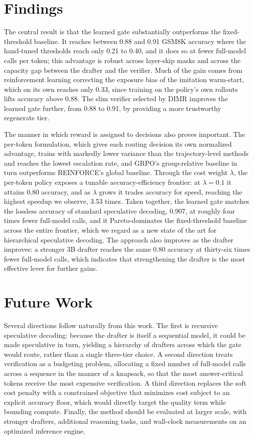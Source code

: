 \documentclass[11pt]{article}
\begin{document}
\section{Findings}
The central result is that the learned gate substantially outperforms the fixed-threshold baseline. It
reaches between 0.88 and 0.91 GSM8K accuracy where the hand-tuned thresholds reach only 0.21 to 0.40,
and it does so at fewer full-model calls per token; this advantage is robust across layer-skip masks
and across the capacity gap between the drafter and the verifier. Much of the gain comes from
reinforcement learning correcting the exposure bias of the imitation warm-start, which on its own
reaches only 0.33, since training on the policy's own rollouts lifts accuracy above 0.88. The slim
verifier selected by DIMR improves the learned gate further, from 0.88 to 0.91, by providing a more
trustworthy regenerate tier.

The manner in which reward is assigned to decisions also proves important. The per-token formulation,
which gives each routing decision its own normalized advantage, trains with markedly lower variance
than the trajectory-level methods and reaches the lowest escalation rate, and GRPO's group-relative
baseline in turn outperforms REINFORCE's global baseline. Through the cost weight $\lambda$, the
per-token policy exposes a tunable accuracy-efficiency frontier: at $\lambda=0.1$ it attains 0.80
accuracy, and as $\lambda$ grows it trades accuracy for speed, reaching the highest speedup we observe,
3.53 times. Taken together, the learned gate matches the lossless accuracy of standard speculative
decoding, 0.907, at roughly four times fewer full-model calls, and it Pareto-dominates the
fixed-threshold baseline across the entire frontier, which we regard as a new state of the art for
hierarchical speculative decoding. The approach also improves as the drafter improves: a stronger 3B
drafter reaches the same 0.80 accuracy at thirty-six times fewer full-model calls, which indicates that
strengthening the drafter is the most effective lever for further gains.

\section{Future Work}
Several directions follow naturally from this work. The first is recursive speculative decoding:
because the drafter is itself a sequential model, it could be made speculative in turn, yielding a
hierarchy of drafters across which the gate would route, rather than a single three-tier choice. A second direction treats verification as a budgeting problem, allocating a fixed
number of full-model calls across a sequence in the manner of a knapsack, so that the most
answer-critical tokens receive the most expensive verification. A third direction replaces the soft
cost penalty with a constrained objective that minimizes cost subject to an explicit accuracy floor,
which would directly target the quality term while bounding compute. Finally, the method should be
evaluated at larger scale, with stronger drafters, additional reasoning tasks, and wall-clock
measurements on an optimized inference engine.
\end{document}

